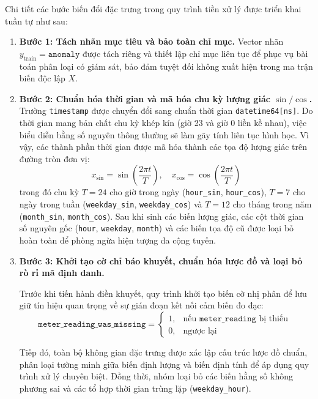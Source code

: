 Chi tiết các bước biến đổi đặc trưng trong quy trình tiền xử lý được triển khai tuần tự như sau:

\begin{enumerate}
    \item \textbf{Bước 1: Tách nhãn mục tiêu và bảo toàn chỉ mục.}
    Vector nhãn $y_{\text{train}} = \texttt{anomaly}$ được tách riêng và thiết lập chỉ mục liên tục để phục vụ bài toán phân loại có giám sát, bảo đảm tuyệt đối không xuất hiện trong ma trận biến độc lập $X$.

    \item \textbf{Bước 2: Chuẩn hóa thời gian và mã hóa chu kỳ lượng giác $\sin/\cos$.}
    Trường \texttt{timestamp} được chuyển đổi sang chuẩn thời gian \texttt{datetime64[ns]}. Do thời gian mang bản chất chu kỳ khép kín (giờ 23 và giờ 0 liền kề nhau), việc biểu diễn bằng số nguyên thông thường sẽ làm gãy tính liên tục hình học. Vì vậy, các thành phần thời gian được mã hóa thành các tọa độ lượng giác trên đường tròn đơn vị:
    \begin{equation*}
        x_{\sin} = \sin\left(\frac{2\pi t}{T}\right), \quad x_{\cos} = \cos\left(\frac{2\pi t}{T}\right)
    \end{equation*}
    trong đó chu kỳ $T=24$ cho giờ trong ngày (\texttt{hour\_sin}, \texttt{hour\_cos}), $T=7$ cho ngày trong tuần (\texttt{weekday\_sin}, \texttt{weekday\_cos}) và $T=12$ cho tháng trong năm (\texttt{month\_sin}, \texttt{month\_cos}). Sau khi sinh các biến lượng giác, các cột thời gian số nguyên gốc (\texttt{hour}, \texttt{weekday}, \texttt{month}) và các biến tọa độ cũ được loại bỏ hoàn toàn để phòng ngừa hiện tượng đa cộng tuyến.

    \item \textbf{Bước 3: Khởi tạo cờ chỉ báo khuyết, chuẩn hóa lược đồ và loại bỏ rò rỉ mã định danh.}
    
    Trước khi tiến hành điền khuyết, quy trình khởi tạo biến cờ nhị phân để lưu giữ tín hiệu quan trọng về sự gián đoạn kết nối cảm biến đo đạc:
    \begin{equation*}
        \texttt{meter\_reading\_was\_missing} =
        \begin{cases}
            1, & \text{nếu } \texttt{meter\_reading} \text{ bị thiếu } \\
            0, & \text{ngược lại}
        \end{cases}
    \end{equation*}
    
    Tiếp đó, toàn bộ không gian đặc trưng được xác lập cấu trúc lược đồ chuẩn, phân loại tường minh giữa biến định lượng và biến định tính để áp dụng quy trình xử lý chuyên biệt. Đồng thời, nhóm loại bỏ các biến hằng số không phương sai và các tổ hợp thời gian trùng lặp (\texttt{weekday\_hour}).
    

\end{enumerate}
